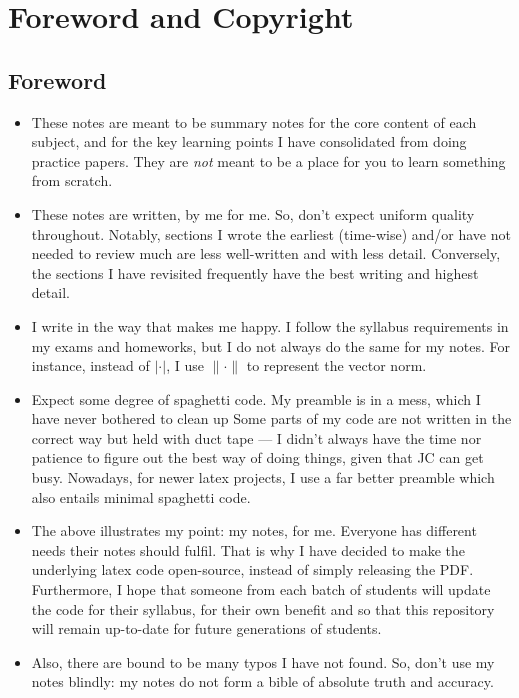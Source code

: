 \chapter{Foreword and Copyright}
\section*{Foreword}
\begin{itemize}
    \item These notes are meant to be summary notes for the core content of each subject, and for the key learning points I have consolidated from doing practice papers. They are \emph{not} meant to be a place for you to learn something from scratch.
    \item These notes are written, by me for me. So, don't expect uniform quality throughout. Notably, sections I wrote the earliest (time-wise) and/or have not needed to review much are less well-written and with less detail. Conversely, the sections I have revisited frequently have the best writing and highest detail.
    \item I write in the way that makes me happy. I follow the syllabus requirements in my exams and homeworks, but I do not always do the same for my notes. For instance, instead of \(\lvert\cdot\rvert\), I use \(\lVert\cdot\rVert\) to represent the vector norm.
    \item Expect some degree of spaghetti code. My preamble is in a mess, which I have never bothered to clean up Some parts of my code are not written in the correct way but held with duct tape --- I didn't always have the time nor patience to figure out the best way of doing things, given that JC can get busy. Nowadays, for newer latex projects, I use a far better preamble which also entails minimal spaghetti code.
    \item The above illustrates my point: my notes, for me. Everyone has different needs their notes should fulfil. That is why I have decided to make the underlying latex code open-source, instead of simply releasing the PDF. Furthermore, I hope that someone from each batch of students will update the code for their syllabus, for their own benefit and so that this repository will remain up-to-date for future generations of students.
    \item Also, there are bound to be many typos I have not found. So, don't use my notes blindly: my notes do not form a bible of absolute truth and accuracy.
\end{itemize}
